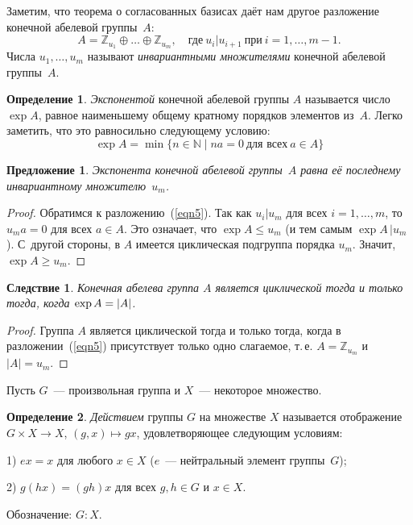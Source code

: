 \documentclass[a4paper,10pt]{amsart}
\def\ZZ{{\mathbb Z}}%
\def\NN{{\mathbb N}}%
\newtheorem{proposition}{Предложение}
\newtheorem{corollary}{Следствие}
\theoremstyle{definition}
\newtheorem{definition}{Определение}
\theoremstyle{remark}
\begin{document}
Заметим, что теорема о согласованных базисах даёт нам другое
разложение конечной абелевой группы~$A$:
\begin{equation} \label{eqn5}
A=\ZZ_{u_1}\oplus\ldots\oplus\ZZ_{u_m}, \quad \text{где} \
u_i|u_{i+1} \ \text{при} \ i = 1, \ldots, m-1.
\end{equation}
Числа $u_1, \ldots, u_m$ называют {\it инвариантными множителями}
конечной абелевой группы~$A$.

\begin{definition}
{\it Экспонентой} конечной абелевой группы $A$ называется число
$\exp A$, равное наименьшему общему кратному порядков элементов
из~$A$. Легко заметить, что это равносильно следующему условию:
$$
\exp A = \min \lbrace n \in \NN \mid na = 0 \
\text{для всех} \ a \in A \rbrace
$$
\end{definition}

\begin{proposition}
Экспонента конечной абелевой группы~$A$ равна её последнему
инвариантному множителю~$u_m$.
\end{proposition}

\begin{proof}
Обратимся к разложению~(\ref{eqn5}). Так как $u_i | u_m$ для всех $i
= 1, \ldots, m$, то $u_ma=0$ для всех $a \in A$. Это означает, что
$\exp A \leqslant u_m$ (и тем самым $\exp A \, | u_m$). С~другой
стороны, в $A$ имеется циклическая подгруппа порядка $u_m$. Значит,
$\exp A \geqslant u_m$.
\end{proof}

\begin{corollary}
Конечная абелева группа $A$ является циклической тогда и только
тогда, когда $\exp A =\nobreak |A|$.
\end{corollary}

\begin{proof}
Группа $A$ является циклической тогда и только тогда, когда в
разложении~(\ref{eqn5}) присутствует только одно слагаемое, т.\,е.
$A = \ZZ_{u_m}$ и $|A| = u_m$.
\end{proof}


Пусть $G$~--- произвольная группа и $X$~--- некоторое множество.

\begin{definition}
\textit{Действием} группы $G$ на множестве $X$ называется
отображение $G\times X\to X$, $(g,x)\mapsto gx$, удовлетворяющее
следующим условиям:

1) $ex=x$ для любого $x\in X$ ($e$~--- нейтральный элемент
группы~$G$);

2) $g(hx)=(gh)x$ для всех $g,h\in G$ и $x\in X$.

Обозначение: $G:X$.
\end{definition}
\end{document}
